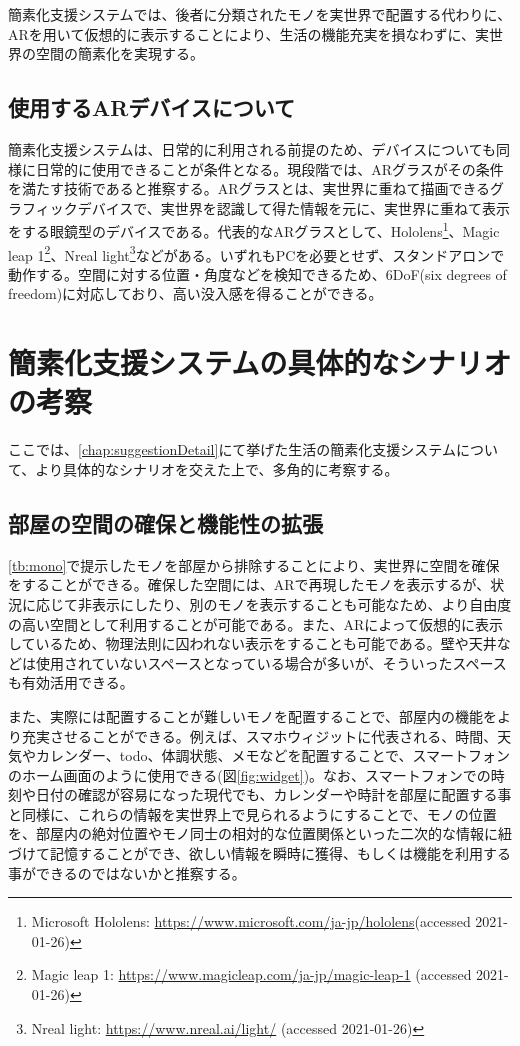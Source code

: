 簡素化支援システムでは、後者に分類されたモノを実世界で配置する代わりに、ARを用いて仮想的に表示することにより、生活の機能充実を損なわずに、実世界の空間の簡素化を実現する。

\subsection{使用するARデバイスについて}
\label{chap:ARdevice}

簡素化支援システムは、日常的に利用される前提のため、デバイスについても同様に日常的に使用できることが条件となる。現段階では、ARグラスがその条件を満たす技術であると推察する。ARグラスとは、実世界に重ねて描画できるグラフィックデバイスで、実世界を認識して得た情報を元に、実世界に重ねて表示をする眼鏡型のデバイスである。代表的なARグラスとして、Hololens\footnote{Microsoft Hololens: \url{https://www.microsoft.com/ja-jp/hololens}(accessed 2021-01-26)}、Magic leap 1\footnote{Magic leap 1: \url{https://www.magicleap.com/ja-jp/magic-leap-1} (accessed 2021-01-26)}、Nreal light\footnote{Nreal light: \url{https://www.nreal.ai/light/} (accessed 2021-01-26)}などがある。いずれもPCを必要とせず、スタンドアロンで動作する。空間に対する位置・角度などを検知できるため、6DoF(six degrees of freedom)に対応しており、高い没入感を得ることができる。

\newpage

\section{簡素化支援システムの具体的なシナリオの考察}

ここでは、\ref{chap:suggestionDetail}にて挙げた生活の簡素化支援システムについて、より具体的なシナリオを交えた上で、多角的に考察する。

\subsection{部屋の空間の確保と機能性の拡張}

\ref{tb:mono}で提示したモノを部屋から排除することにより、実世界に空間を確保をすることができる。確保した空間には、ARで再現したモノを表示するが、状況に応じて非表示にしたり、別のモノを表示することも可能なため、より自由度の高い空間として利用することが可能である。また、ARによって仮想的に表示しているため、物理法則に囚われない表示をすることも可能である。壁や天井などは使用されていないスペースとなっている場合が多いが、そういったスペースも有効活用できる。

また、実際には配置することが難しいモノを配置することで、部屋内の機能をより充実させることができる。例えば、スマホウィジットに代表される、時間、天気やカレンダー、todo、体調状態、メモなどを配置することで、スマートフォンのホーム画面のように使用できる(図\ref{fig:widget})。なお、スマートフォンでの時刻や日付の確認が容易になった現代でも、カレンダーや時計を部屋に配置する事と同様に、これらの情報を実世界上で見られるようにすることで、モノの位置を、部屋内の絶対位置やモノ同士の相対的な位置関係といった二次的な情報に紐づけて記憶することができ、欲しい情報を瞬時に獲得、もしくは機能を利用する事ができるのではないかと推察する。


